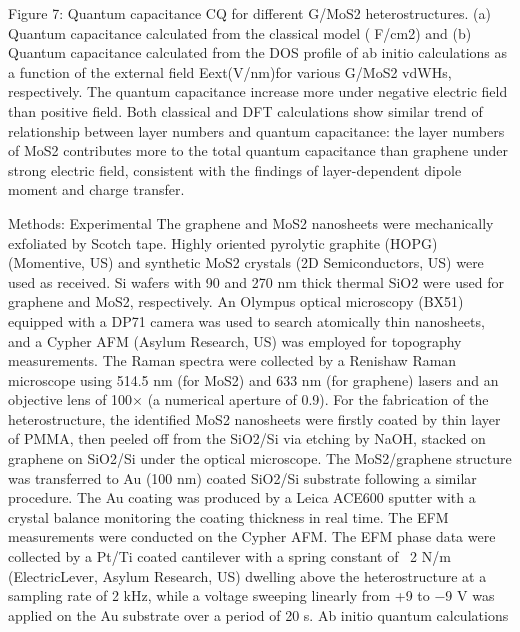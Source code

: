 Figure 7: Quantum capacitance CQ for different G/MoS2 heterostructures. (a) Quantum capacitance calculated from the classical model    (F/cm2)  and (b) Quantum capacitance calculated from the DOS profile of ab initio  calculations   as a function of the external field Eext(V/nm)for various G/MoS2 vdWHs, respectively. The quantum capacitance increase more under negative electric field than positive field. Both classical and DFT calculations show similar trend of relationship between layer numbers and quantum capacitance: the layer numbers of MoS2 contributes more to the total quantum capacitance than graphene under strong electric field, consistent with the findings of layer-dependent dipole moment and charge transfer. 

Methods:
Experimental
The graphene and MoS2 nanosheets were mechanically exfoliated by Scotch tape. Highly oriented pyrolytic graphite (HOPG) (Momentive, US) and synthetic MoS2 crystals (2D Semiconductors, US) were used as received. Si wafers with 90 and 270 nm thick thermal SiO2 were used for graphene and MoS2, respectively. An Olympus optical microscopy (BX51) equipped with a DP71 camera was used to search atomically thin nanosheets, and a Cypher AFM (Asylum Research, US) was employed for topography measurements. The Raman spectra were collected by a Renishaw Raman microscope using 514.5 nm (for MoS2) and 633 nm (for graphene) lasers and an objective lens of 100× (a numerical aperture of 0.9). For the fabrication of the heterostructure, the identified MoS2 nanosheets were firstly coated by thin layer of PMMA, then peeled off from the SiO2/Si via etching by NaOH, stacked on graphene on SiO2/Si under the optical microscope. The MoS2/graphene structure was transferred to Au (100 nm) coated SiO2/Si substrate following a similar procedure. The Au coating was produced by a Leica ACE600 sputter with a crystal balance monitoring the coating thickness in real time. The EFM measurements were conducted on the Cypher AFM. The EFM phase data were collected by a Pt/Ti coated cantilever with a spring constant of ~2 N/m (ElectricLever, Asylum Research, US) dwelling above the heterostructure at a sampling rate of 2 kHz, while a voltage sweeping linearly from +9 to −9 V was applied on the Au substrate over a period of 20 s.
Ab initio quantum calculations
